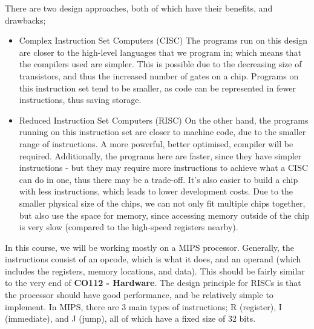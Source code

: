 \documentclass[a4paper, 12pt]{article}
\begin{document}
            There are two design approaches, both of which have their benefits, and drawbacks;
            \begin{itemize}
                \itemsep0em
                \item Complex Instruction Set Computers (CISC)
                    \subitem The programs run on this design are closer to the high-level languages that we program in; which means that the compilers used are simpler. This is possible due to the decreasing size of transistors, and thus the increased number of gates on a chip. Programs on this instruction set tend to be smaller, as code can be represented in fewer instructions, thus saving storage.
                \item Reduced Instruction Set Computers (RISC)
                    \subitem On the other hand, the programs running on this instruction set are closer to machine code, due to the smaller range of instructions. A more powerful, better optimised, compiler will be required. Additionally, the programs here are faster, since they have simpler instructions - but they may require more instructions to achieve what a CISC can do in one, thus there may be a trade-off. It's also easier to build a chip with less instructions, which leads to lower development costs. Due to the smaller physical size of the chips, we can not only fit multiple chips together, but also use the space for memory, since accessing memory outside of the chip is very slow (compared to the high-speed registers nearby).
            \end{itemize}
            In this course, we will be working mostly on a MIPS processor. Generally, the instructions consist of an opcode, which is what it does, and an operand (which includes the registers, memory locations, and data). This should be fairly similar to the very end of \textbf{CO112 - Hardware}. The design principle for RISCs is that the processor should have good performance, and be relatively simple to implement. In MIPS, there are 3 main types of instructions; R (register), I (immediate), and J (jump), all of which have a fixed size of 32 bits.
            \medskip
\end{document}
